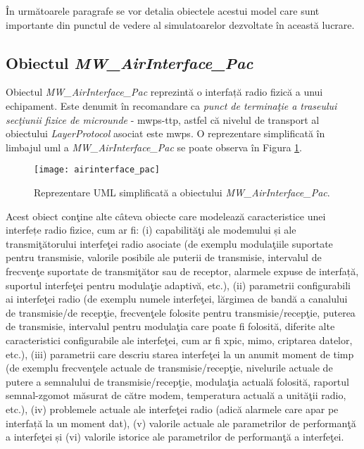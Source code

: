 În următoarele paragrafe se vor detalia obiectele acestui model care sunt importante din punctul de vedere al simulatoarelor dezvoltate în această lucrare.

\subsection{Obiectul \textit{MW\_AirInterface\_Pac}}

Obiectul \textit{MW\_AirInterface\_Pac} reprezintă o interfață radio fizică a unui echipament. Este denumit în recomandare ca \textit{punct de terminaţie a traseului secţiunii fizice de microunde} - \gls{mwps-ttp}, astfel că nivelul de transport al obiectului \textit{LayerProtocol} asociat este \gls{mwps}. O reprezentare simplificată în limbajul \gls{uml} a \textit{MW\_AirInterface\_Pac} se poate observa în Figura \ref{fig:airinterface_pac}.

\begin{figure}[h]
	\centering
	\texttt{[image: airinterface\_pac]}
	\caption{Reprezentare UML simplificată a obiectului \textit{MW\_AirInterface\_Pac}.}
	\label{fig:airinterface_pac}
\end{figure}

Acest obiect conţine alte câteva obiecte care modelează caracteristice unei interfețe radio fizice, cum ar fi: (i) capabilităţi ale modemului și ale transmiţătorului interfeţei radio asociate (de exemplu modulaţiile suportate pentru transmisie, valorile posibile ale puterii de transmisie, intervalul de frecvenţe suportate de transmiţător sau de receptor, alarmele expuse de interfață, suportul interfeţei pentru modulaţie adaptivă, etc.), (ii) parametrii configurabili ai interfeţei radio (de exemplu numele interfeţei, lărgimea de bandă a canalului de transmisie/de recepţie, frecvenţele folosite pentru transmisie/recepţie, puterea de transmisie, intervalul pentru modulaţia care poate fi folosită, diferite alte caracteristici configurabile ale interfeţei, cum ar fi \gls{xpic}, \gls{mimo}, criptarea datelor, etc.), (iii) parametrii care descriu starea interfeţei la un anumit moment de timp (de exemplu frecvenţele actuale de transmisie/recepţie, nivelurile actuale de putere a semnalului de transmisie/recepţie, modulaţia actuală folosită, raportul semnal-zgomot măsurat de către modem, temperatura actuală a unităţii radio, etc.), (iv) problemele actuale ale interfeţei radio (adică alarmele care apar pe interfață la un moment dat), (v) valorile actuale ale parametrilor de performanţă a interfeţei și (vi) valorile istorice ale parametrilor de performanţă a interfeţei.


